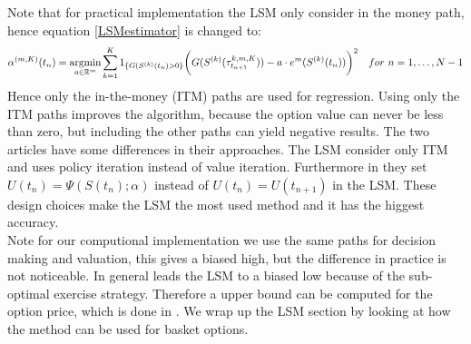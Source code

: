 Note that for practical implementation the LSM only consider in the money path, hence equation \eqref{LSMestimator} is changed to:
\begin{equation*}
\alpha^{(m,K)}(t_n)= \operatorname*{argmin}_{a\in \mathbb{R}^m} \sum_{k=1}^{K} 1_{\{G(S^{(k)}(t_n)>0\}} \bigg(G(S^{(k)}(\tau^{k,m,K}_{t_{n+1}}))  -a \cdot e^m(S^{(k)}(t_{n})) \bigg)^2 \quad for \ n=1, \ldots, N-1
\end{equation*}
Hence only the in-the-money (ITM) paths are used for regression. Using only the ITM paths improves the algorithm, because the option value can never be less than zero, but including the other paths can yield negative results. The two articles \parencite{LSM, Tsitsiklis} have some differences in their approaches. The LSM consider only ITM and uses policy iteration instead of value iteration. Furthermore in \parencite{Tsitsiklis} they set $U(t_n)= \Psi(S(t_n); \alpha)$ instead of $U(t_n)= U(t_{n+1})$ in the LSM. These design choices make the LSM the most used method and it has the higgest accuracy.\\

Note for our computional implementation we use the same paths for decision making and valuation, this gives a biased high, but the difference in practice is not noticeable. In general leads the LSM to a biased low because of the sub-optimal exercise strategy. Therefore a upper bound can be computed for the option price, which is done in \parencite{AndersenLeif2004}. We wrap up the LSM section by looking at how the method can be used for basket options.

